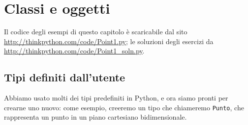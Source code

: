\documentclass[10pt]{book}
\begin{document}









\chapter{Classi e oggetti}

Il codice degli esempi di questo capitolo è scaricabile dal sito
\url{http://thinkpython.com/code/Point1.py}; le soluzioni degli esercizi da
\url{http://thinkpython.com/code/Point1_soln.py}.


\section{Tipi definiti dall'utente}
\label{point}

Abbiamo usato molti dei tipi predefiniti in Python, e ora siamo pronti
   per crearne uno nuovo: come esempio, creeremo un tipo che chiameremo {\tt Punto}, che rappresenta un punto in un piano cartesiano bidimensionale.
\end{document}
